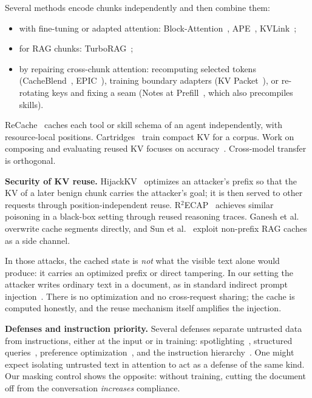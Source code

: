 \documentclass[10pt]{article}
\begin{document}
Several methods encode chunks independently and then combine them:
\begin{itemize}\itemsep0pt
\item with fine-tuning or adapted attention: Block-Attention~\citep{ma2025blockattention}, APE~\citep{yang2025ape},
  KVLink~\citep{yang2025kvlink};
\item for RAG chunks: TurboRAG~\citep{lu2024turborag};
\item by repairing cross-chunk attention: recomputing selected tokens (CacheBlend~\citep{yao2025cacheblend},
  EPIC~\citep{hu2024epic}), training boundary adapters (KV Packet~\citep{chen2026kvpacket}), or re-rotating keys and fixing a
  seam (Notes at Prefill~\citep{li2026notes}, which also precompiles skills).
\end{itemize}
ReCache~\citep{fang2026recache} caches each tool or skill schema of an agent independently, with resource-local positions.
Cartridges~\citep{eyuboglu2025cartridges} train compact KV for a corpus. Work on composing and evaluating reused KV focuses on
accuracy~\citep{shepard2026costs,rakotonirina2026where,cestola2026evaluating}. Cross-model transfer~\citep{liu2024droidspeak,fu2025c2c}
is orthogonal.

\textbf{Security of KV reuse.} HijackKV~\citep{zhang2026hijackkv} optimizes an attacker's prefix so that the KV of a later
benign chunk carries the attacker's goal; it is then served to other requests through position-independent reuse.
R$^2$ECAP~\citep{zhu2026r2ecap} achieves similar poisoning in a black-box setting through reused reasoning traces. Ganesh et
al.~\citep{ganesh2025narrative} overwrite cache segments directly, and Sun et al.~\citep{sun2026sidechannel} exploit non-prefix
RAG caches as a side channel.

In those attacks, the cached state is \emph{not} what the visible text alone would produce: it carries an optimized prefix or
direct tampering. In our setting the attacker writes ordinary text in a document, as in standard indirect prompt
injection~\citep{greshake2023indirect,zhan2024injecagent,debenedetti2024agentdojo,yi2025bipia}. There is no optimization and no
cross-request sharing; the cache is computed honestly, and the reuse mechanism itself amplifies the injection.

\textbf{Defenses and instruction priority.} Several defenses separate untrusted data from instructions, either at the input or
in training: spotlighting~\citep{hines2024spotlighting}, structured queries~\citep{chen2025struq}, preference
optimization~\citep{chen2025secalign}, and the instruction hierarchy~\citep{wallace2024hierarchy}. One might expect isolating
untrusted text in attention to act as a defense of the same kind. Our masking control shows the opposite: without training,
cutting the document off from the conversation \emph{increases} compliance.
\end{document}
